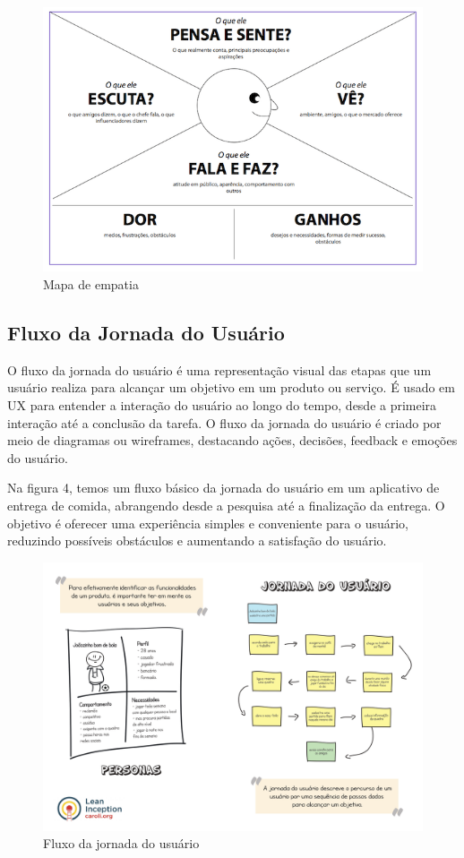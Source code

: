 \documentclass[12pt]{article}
\begin{document}
\begin{figure}[ht]
\centering
\includegraphics[width=.7\textwidth, scale=6.7]{mapa.png}
\caption{Mapa de empatia}
\label{fig:typical-figure}
\end{figure}

\subsection{Fluxo da Jornada do Usuário}
O fluxo da jornada do usuário é uma representação visual das etapas que um usuário realiza para alcançar um objetivo em um produto ou serviço. É usado em UX para entender a interação do usuário ao longo do tempo, desde a primeira interação até a conclusão da tarefa.
O fluxo da jornada do usuário é criado por meio de diagramas ou wireframes, destacando ações, decisões, feedback e emoções do usuário.

Na figura 4, temos um fluxo básico da jornada do usuário em um aplicativo de entrega de comida, abrangendo desde a pesquisa até a finalização da entrega. O objetivo é oferecer uma experiência simples e conveniente para o usuário, reduzindo possíveis obstáculos e aumentando a satisfação do usuário.

\begin{figure}[ht]
\centering
\includegraphics[width=.5\textwidth, scale=6.7]{jornada.jpg}
\caption{Fluxo da jornada do usuário}
\label{fig:typical-figure}
\end{figure}
\end{document}
